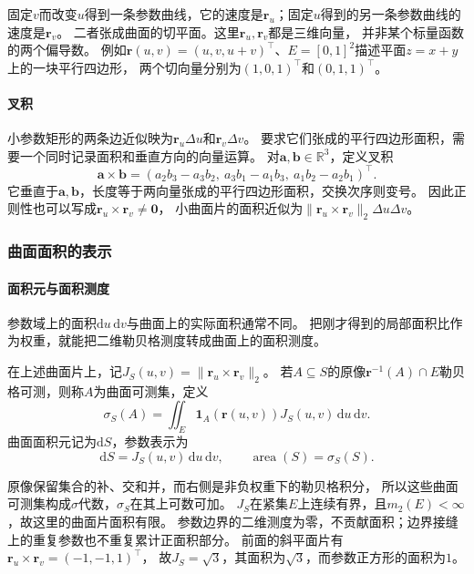 固定$v$而改变$u$得到一条参数曲线，它的速度是$\bm r_u$；固定$u$得到的另一条参数曲线的速度是$\bm r_v$。
二者张成曲面的切平面。这里$\bm r_u,\bm r_v$都是三维向量，
并非某个标量函数的两个偏导数。
例如$\bm r(u,v)=(u,v,u+v)^\top$、$E=[0,1]^2$描述平面$z=x+y$上的一块平行四边形，
两个切向量分别为$(1,0,1)^\top$和$(0,1,1)^\top$。

\paragraph{叉积}

小参数矩形的两条边近似映为$\bm r_u\Delta u$和$\bm r_v\Delta v$。
要求它们张成的平行四边形面积，需要一个同时记录面积和垂直方向的向量运算。
对$\bm a,\bm b\in\mathbb R^3$，定义叉积
\[
 \bm a\times\bm b
 =(a_2b_3-a_3b_2,\ a_3b_1-a_1b_3,\ a_1b_2-a_2b_1)^\top.
\]
它垂直于$\bm a,\bm b$，长度等于两向量张成的平行四边形面积，交换次序则变号。
因此正则性也可以写成$\bm r_u\times\bm r_v\ne\bm0$，
小曲面片的面积近似为$\lVert\bm r_u\times\bm r_v\rVert_2\Delta u\Delta v$。

\subsubsection{曲面面积的表示}

\paragraph{面积元与面积测度}

参数域上的面积$\mathrm du\,\mathrm dv$与曲面上的实际面积通常不同。
把刚才得到的局部面积比作为权重，就能把二维勒贝格测度转成曲面上的面积测度。

\begin{definition}[曲面面积测度]
\label{def:analysis-surface-area-measure}
在上述曲面片上，记$J_S(u,v)=\lVert\bm r_u\times\bm r_v\rVert_2$。
若$A\subseteq S$的原像$\bm r^{-1}(A)\cap E$勒贝格可测，则称$A$为曲面可测集，定义
\[
 \sigma_S(A)=\iint_E\bm1_A(\bm r(u,v))J_S(u,v)\,\mathrm du\,\mathrm dv.
\]
曲面面积元记为$\mathrm dS$，参数表示为
\[
 \mathrm dS=J_S(u,v)\,\mathrm du\,\mathrm dv,
 \qquad \operatorname{area}(S)=\sigma_S(S).
\]
\end{definition}

原像保留集合的补、交和并，而右侧是非负权重下的勒贝格积分，
所以这些曲面可测集构成$\sigma$代数，$\sigma_S$在其上可数可加。
$J_S$在紧集$E$上连续有界，且$m_2(E)<\infty$，故这里的曲面片面积有限。
参数边界的二维测度为零，不贡献面积；边界接缝上的重复参数也不重复累计正面积部分。
前面的斜平面片有$\bm r_u\times\bm r_v=(-1,-1,1)^\top$，
故$J_S=\sqrt3$，其面积为$\sqrt3$，而参数正方形的面积为$1$。


